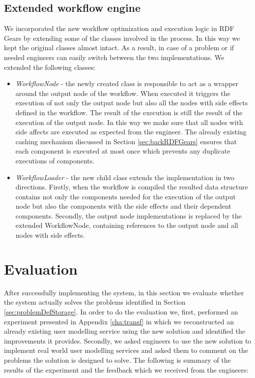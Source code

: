 \subsection{Extended workflow engine}

We incorporated the new workflow optimization and execution logic in RDF Gears by extending some of the classes involved in the process. In this way we kept the original classes almost intact. As a result, in case of a problem or if needed engineers can easily switch between the two implementations. We extended the following classes:

\begin{itemize}
	\item \textit{WorkflowNode} - the newly created class is responsible to act as a wrapper around the output node of the workflow. When executed it triggers the execution of not only the output node but also all the nodes with side effects defined in the workflow. The result of the execution is still the result of the execution of the output node. In this way we make sure that all nodes with side affects are executed as expected from the engineer. The already existing cashing mechanism discussed in Section \ref{sec:backRDFGears} ensures that each component is executed at most once which prevents any duplicate executions of components.
	
	\item \textit{WorkflowLoader} - the new child class extends the implementation in two directions. Firstly, when the workflow is compiled the resulted data structure contains not only the components needed for the execution of the output node but also the components with the side effects and their dependent components. Secondly, the output node implementations is replaced by the extended WorkflowNode, containing references to the output node and all nodes with side effects.
\end{itemize}


\section{Evaluation} 
\label{sec:evalStorage}

After successfully implementing the system, in this section we evaluate whether the system actually solves the problems identified in Section \ref{sec:problemDefStorage}. In order to do the evaluation we, first, performed an experiment presented in Appendix \ref{cha:transf} in which we reconstructed an already existing user modelling service using the new solution and identified the improvements it provides. Secondly, we asked engineers to use the new solution to implement real world user modelling services and asked them to comment on the problems the solution is designed to solve. The following is summary of the results of the experiment and the feedback which we received from the engineers:

